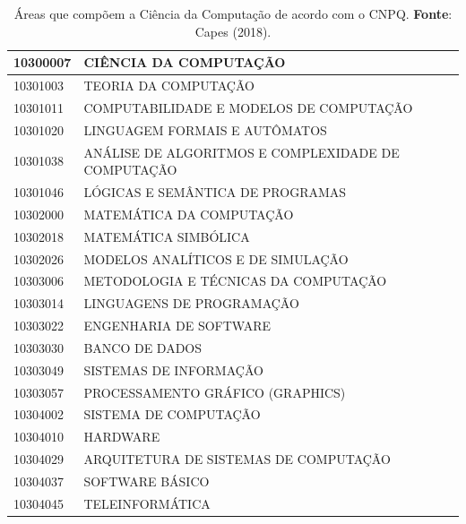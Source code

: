 \begin{table}[hd]
	\caption{Áreas que compõem a Ciência da Computação de acordo com o CNPQ. \textbf{Fonte}: Capes (2018).}
	\label{tab:AreasCNPQ}
	\begin{tabular}{|l|l|}
		\hline
		\textbf{10300007} & \textbf{CIÊNCIA DA COMPUTAÇÃO}                     \\ \hline
		10301003          & TEORIA DA COMPUTAÇÃO                               \\ \hline
		10301011          & COMPUTABILIDADE E MODELOS DE COMPUTAÇÃO            \\ \hline
		10301020          & LINGUAGEM FORMAIS E AUTÔMATOS                      \\ \hline
		10301038          & ANÁLISE DE ALGORITMOS E COMPLEXIDADE DE COMPUTAÇÃO \\ \hline
		10301046          & LÓGICAS E SEMÂNTICA DE PROGRAMAS                   \\ \hline
		10302000          & MATEMÁTICA DA COMPUTAÇÃO                           \\ \hline
		10302018          & MATEMÁTICA SIMBÓLICA                               \\ \hline
		10302026          & MODELOS ANALÍTICOS E DE SIMULAÇÃO                  \\ \hline
		10303006          & METODOLOGIA E TÉCNICAS DA COMPUTAÇÃO               \\ \hline
		10303014          & LINGUAGENS DE PROGRAMAÇÃO                          \\ \hline
		10303022          & ENGENHARIA DE SOFTWARE                             \\ \hline
		10303030          & BANCO DE DADOS                                     \\ \hline
		10303049          & SISTEMAS DE INFORMAÇÃO                             \\ \hline
		10303057          & PROCESSAMENTO GRÁFICO (GRAPHICS)                   \\ \hline
		10304002          & SISTEMA DE COMPUTAÇÃO                              \\ \hline
		10304010          & HARDWARE                                           \\ \hline
		10304029          & ARQUITETURA DE SISTEMAS DE COMPUTAÇÃO              \\ \hline
		10304037          & SOFTWARE BÁSICO                                    \\ \hline
		10304045          & TELEINFORMÁTICA                                    \\ \hline
	\end{tabular}
\end{table}

